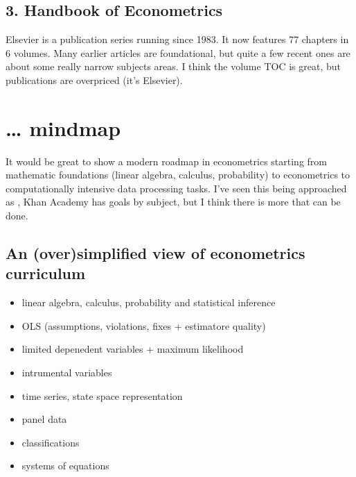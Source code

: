 \documentclass[letterpaper,10pt,english]{sphinxmanual}
\begin{document}
\subsection{3. Handbook of Econometrics}
\label{\detokenize{textbook/ways-into-econometrics:handbook-of-econometrics}}
Elsevier 
is a  publication series running since 1983. It now features 77 chapters in 6 volumes. Many earlier articles are foundational, but quite a few recent ones are about some really narrow
subjects areas. I think the volume TOC is great, but publications are overpriced
(it’s Elsevier).


\section{… mindmap}
\label{\detokenize{textbook/mindmap:mindmap}}\label{\detokenize{textbook/mindmap::doc}}
It would be great to show a modern roadmap in econometrics starting
from mathematic foundations (linear algebra, calculus, probability) to
econometrics to computationally intensive data processing tasks.
I’ve seen this being approached as ,
Khan Academy has goals by subject, but I think there is more that
can be done.


\subsection{An (over)simplified view of econometrics curriculum}
\label{\detokenize{textbook/mindmap:an-over-simplified-view-of-econometrics-curriculum}}\begin{itemize}
\item {} 
linear algebra, calculus, probability and statistical inference

\item {} 
OLS (assumptions, violations, fixes + estimatore quality)

\item {} 
limited depenedent variables + maximum likelihood

\item {} 
intrumental variables

\item {} 
time series, state space representation

\item {} 
panel data

\item {} 
classifications

\item {} 
systems of equations

\end{itemize}
\end{document}
